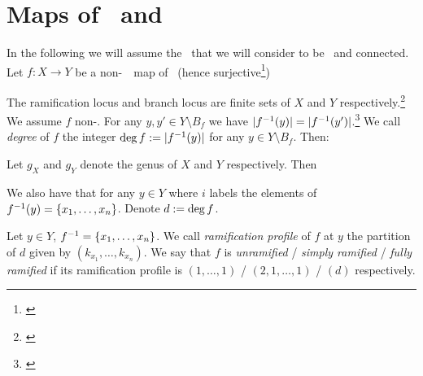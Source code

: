 \documentclass[../main/main.tex]{subfiles}
\begin{document}
\section{Maps of \rss\ and \hnn}

In the following we will assume the \rss\ that we will consider to be \cpt\ and connected. Let $f\colon X\to Y$ be a non-\const\ \holo\ map of \rss\ (hence surjective\footnote{\cite[Thm. 4.3.1]{CM}})

\begin{definition}
\end{definition}

The ramification locus and branch locus are finite sets of $X$ and $Y$ respectively.\footnote{\cite[Lemma 4.2.5.]{CM}} We assume $f$ non-\const. For any $y,y'\in Y\setminus B_f$ we have $|f^{-1}(y)|=|f^{-1}(y')|$.\footnote{\cite[Thm. 4.3.3]{CM}} We call \emph{degree} of $f$ the integer $\deg f:=|f^{-1}(y)|$ for any $y\in Y\setminus B_f$. Then:

\begin{theorem}
	Let $g_X$ and $g_Y$ denote the genus of $X$ and $Y$ respectively. Then
\end{theorem}

We also have that for any $y\in Y$
where $i$ labels the elements of $f^{-1}(y)=\{x_1,\ldots,x_n\}$. Denote $d:=\deg f$. 

\begin{definition}
	Let $y\in Y$, $f^{-1}=\{x_1,\ldots,x_n\}$. We call \emph{ramification profile} of $f$ at $y$ the partition of $d$ given by $(k_{x_1},\ldots,k_{x_n})$. We say that $f$ is \emph{unramified} / \emph{simply ramified} / \emph{fully ramified} if its ramification profile is $(1,\ldots,1)$ / $(2,1,\ldots,1)$ / $(d)$ respectively.
\end{definition}
\end{document}
